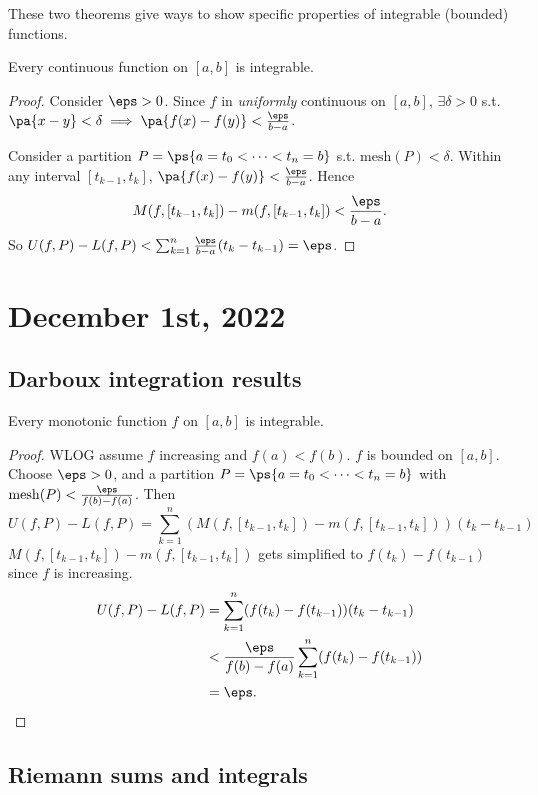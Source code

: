 \documentclass[11pt]{scrartcl}
\numberwithin{equation}{section}
\begin{document}
These two theorems give ways to show specific properties of integrable 
(bounded) functions.
\begin{theorem}
    Every continuous function on $[a,b]$ is integrable.
\end{theorem}
\begin{proof}
    Consider $\eps>0$. Since $f$ in \textit{uniformly} continuous on $[a,b]$, $\exists \delta>0$ s.t. $\pa{x-y}<\delta \implies \pa{f(x)-f(y)}<\frac{\eps}{b-a}$. 
    
    Consider a partition $P = \ps{a=t_0<\cdots<t_n=b}$
    s.t. $\mathrm{mesh}(P) < \delta$.
    Within any interval $[t_{k-1},t_k]$, $\pa{f(x)-f(y)}<\frac{\eps}{b-a}$.
    Hence 
    \[
        M(f,[t_{k-1},t_k]) - m(f,[t_{k-1},t_k]) < \frac{\eps}{b-a}.
    \]
    So $U(f,P)-L(f,P)<\sum_{k=1}^{n}\frac{\eps}{b-a}(t_k-t_{k-1}) = \eps$.
\end{proof}
\clearpage
\section{December 1st, 2022}
\subsection{Darboux integration results}
\begin{theorem}
    Every monotonic function $f$ on $[a,b]$ is integrable.
\end{theorem}
\begin{proof}
    WLOG assume $f$ increasing and $f(a)<f(b)$.
    $f$ is bounded on $[a,b]$. Choose $\eps>0$, and a partition 
    $P = \ps{a=t_0<\cdots<t_n=b}$ with $\mathrm{mesh}(P) < \frac{\eps}{f(b)-f(a)}$. Then 
    \[
        U(f,P) - L(f,P) = \sum_{k=1}^{n}(M(f, [t_{k-1},t_k])-m(f, [t_{k-1},t_k]))(t_k - t_{k-1})
    \]
    $M(f, [t_{k-1},t_k])-m(f, [t_{k-1},t_k])$ gets simplified to $f(t_k)-f(t_{k-1})$ since $f$ is increasing.
    \begin{align*}
        U(f,P) - L(f,P) &= \sum_{k=1}^{n}(f(t_k)-f(t_{k-1}))(t_k - t_{k-1}) \\
        &< \frac{\eps}{f(b)-f(a)} \sum_{k=1}^{n}(f(t_k)-f(t_{k-1}))\\
        &= \eps. \qedhere
    \end{align*}
\end{proof}
\subsection{Riemann sums and integrals}
\end{document}
